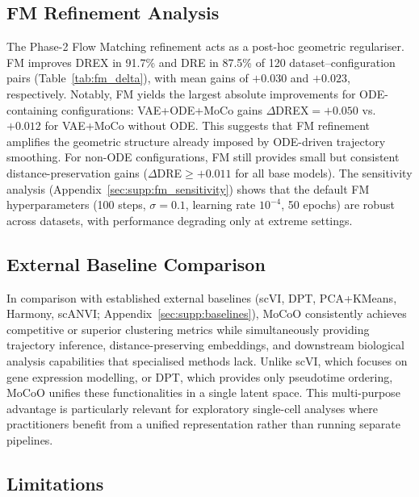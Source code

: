 \documentclass[biology,article,submit,pdftex]{Definitions/mdpi}
\begin{document}
\subsection{FM Refinement Analysis}
\label{sec:discussion:fm}

The Phase-2 Flow Matching refinement acts as a post-hoc geometric regulariser. FM improves DREX in 91.7\% and DRE in 87.5\% of 120 dataset--configuration pairs (Table~\ref{tab:fm_delta}), with mean gains of $+0.030$ and $+0.023$, respectively. Notably, FM yields the largest absolute improvements for ODE-containing configurations: VAE+ODE+MoCo gains $\Delta$DREX$=+0.050$ vs.\ $+0.012$ for VAE+MoCo without ODE. This suggests that FM refinement amplifies the geometric structure already imposed by ODE-driven trajectory smoothing. For non-ODE configurations, FM still provides small but consistent distance-preservation gains ($\Delta$DRE$\geq+0.011$ for all base models). The sensitivity analysis (Appendix~\ref{sec:supp:fm_sensitivity}) shows that the default FM hyperparameters (100 steps, $\sigma{=}0.1$, learning rate $10^{-4}$, 50 epochs) are robust across datasets, with performance degrading only at extreme settings.

\subsection{External Baseline Comparison}
\label{sec:discussion:baselines}

In comparison with established external baselines (scVI, DPT, PCA+KMeans, Harmony, scANVI; Appendix~\ref{sec:supp:baselines}), MoCoO consistently achieves competitive or superior clustering metrics while simultaneously providing trajectory inference, distance-preserving embeddings, and downstream biological analysis capabilities that specialised methods lack. Unlike scVI, which focuses on gene expression modelling, or DPT, which provides only pseudotime ordering, MoCoO unifies these functionalities in a single latent space. This multi-purpose advantage is particularly relevant for exploratory single-cell analyses where practitioners benefit from a unified representation rather than running separate pipelines.

\subsection{Limitations}
\label{sec:discussion:limitations}
\end{document}
